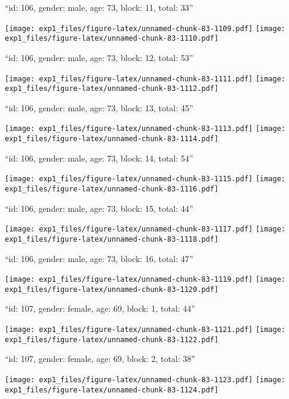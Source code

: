\documentclass[11pt,,]{article}
\begin{document}
\newpage
[1] 

``id: 106, gender: male, age: 73, block: 11, total: 33''

\texttt{[image: exp1\_files/figure-latex/unnamed-chunk-83-1109.pdf]}
\texttt{[image: exp1\_files/figure-latex/unnamed-chunk-83-1110.pdf]}

\newpage
[1] 

``id: 106, gender: male, age: 73, block: 12, total: 53''

\texttt{[image: exp1\_files/figure-latex/unnamed-chunk-83-1111.pdf]}
\texttt{[image: exp1\_files/figure-latex/unnamed-chunk-83-1112.pdf]}

\newpage
[1] 

``id: 106, gender: male, age: 73, block: 13, total: 45''

\texttt{[image: exp1\_files/figure-latex/unnamed-chunk-83-1113.pdf]}
\texttt{[image: exp1\_files/figure-latex/unnamed-chunk-83-1114.pdf]}

\newpage
[1] 

``id: 106, gender: male, age: 73, block: 14, total: 54''

\texttt{[image: exp1\_files/figure-latex/unnamed-chunk-83-1115.pdf]}
\texttt{[image: exp1\_files/figure-latex/unnamed-chunk-83-1116.pdf]}

\newpage
[1] 

``id: 106, gender: male, age: 73, block: 15, total: 44''

\texttt{[image: exp1\_files/figure-latex/unnamed-chunk-83-1117.pdf]}
\texttt{[image: exp1\_files/figure-latex/unnamed-chunk-83-1118.pdf]}

\newpage
[1] 

``id: 106, gender: male, age: 73, block: 16, total: 47''

\texttt{[image: exp1\_files/figure-latex/unnamed-chunk-83-1119.pdf]}
\texttt{[image: exp1\_files/figure-latex/unnamed-chunk-83-1120.pdf]}

\newpage
[1] 

``id: 107, gender: female, age: 69, block: 1, total: 44''

\texttt{[image: exp1\_files/figure-latex/unnamed-chunk-83-1121.pdf]}
\texttt{[image: exp1\_files/figure-latex/unnamed-chunk-83-1122.pdf]}

\newpage
[1] 

``id: 107, gender: female, age: 69, block: 2, total: 38''

\texttt{[image: exp1\_files/figure-latex/unnamed-chunk-83-1123.pdf]}
\texttt{[image: exp1\_files/figure-latex/unnamed-chunk-83-1124.pdf]}
\end{document}
